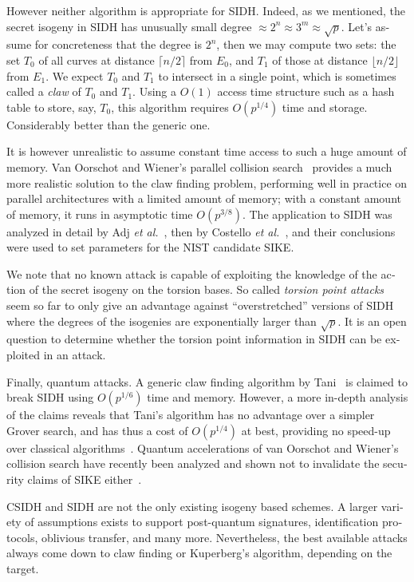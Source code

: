 \begin{otherlanguage}{english}
However neither algorithm is appropriate for SIDH. Indeed, as we
mentioned, the secret isogeny in SIDH has unusually small degree
$\approx 2^n\approx 3^m\approx \sqrt{p}$. Let's assume for
concreteness that the degree is $2^n$, then we may compute two sets:
the set $T_0$ of all curves at distance $\lceil n/2\rceil$ from $E_0$,
and $T_1$ of those at distance $\lfloor n/2\rfloor$ from $E_1$.  We
expect $T_0$ and $T_1$ to intersect in a single point, which is
sometimes called a \emph{claw} of $T_0$ and $T_1$.  Using a $O(1)$
access time structure such as a hash table to store, say, $T_0$, this
algorithm requires $O(p^{1/4})$ time and storage. Considerably better
than the generic one.

It is however unrealistic to assume constant time access to such a
huge amount of memory. Van Oorschot and Wiener's parallel collision
search~\cite{JC:VanWie99} provides a much more realistic solution to
the claw finding problem, performing well in practice on parallel
architectures with a limited amount of memory; with a constant amount
of memory, it runs in asymptotic time $O(p^{3/8})$. The application to
SIDH was analyzed in detail by Adj \emph{et al.}~\cite{SAC:ACCMR18},
then by Costello \emph{et al.}~\cite{PKC:CLNRV20}, and their
conclusions were used to set parameters for the NIST candidate SIKE.

We note that no known attack is capable of exploiting the knowledge of
the action of the secret isogeny on the torsion bases. So called
\emph{torsion point attacks}~\cite{AC:Petit17,EPRINT:KMPPS20,cryptoeprint:2021:282} seem so
far to only give an advantage against ``overstretched'' versions of
SIDH where the degrees of the isogenies are exponentially larger than
$\sqrt{p}$. It is an open question to determine whether the torsion
point information in SIDH can be exploited in an attack.

Finally, quantum attacks. A generic claw finding algorithm by
Tani~\cite{tani2009claw} is claimed to break SIDH using $O(p^{1/6})$
time and memory. However, a more in-depth analysis of the claims
reveals that Tani's algorithm has no advantage over a simpler Grover
search, and has thus a cost of $O(p^{1/4})$ at best, providing no
speed-up over classical algorithms~\cite{C:JaqSch19}. Quantum
accelerations of van Oorschot and Wiener's collision search have
recently been analyzed and shown not to invalidate the security claims
of SIKE either~\cite{EPRINT:JaqSch20}.

CSIDH and SIDH are not the only existing isogeny based schemes.  A
larger variety of assumptions exists to support post-quantum
signatures, identification protocols, oblivious transfer, and many
more. Nevertheless, the best available attacks always come down to
claw finding or Kuperberg's algorithm, depending on the target.


\end{otherlanguage}

